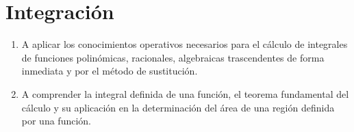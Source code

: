 \newpage
\justify
\chapter{Integraci\'on}


\begin{center}
\begin{tcolorbox}[enhanced,colback=blue!5!white, colframe=blue!5!white, title=?`Qu\'e vas a aprender?,coltitle=black, attach boxed title to top center=
{yshift=-\tcboxedtitleheight/2},
boxed title style={size=small,colback=blue!50!white}]
\begin{enumerate}
\item A aplicar los conocimientos operativos necesarios para el c\'alculo de integrales de funciones polin\'omicas, racionales, algebraicas trascendentes de forma inmediata y por el m\'etodo de sustituci\'on.\\
\item A comprender la integral definida de una funci\'on, el teorema  fundamental  del c\'alculo y su aplicaci\'on en la determinaci\'on del \'area de una regi\'on definida por una funci\'on. 
\end{enumerate}
\end{tcolorbox}
\end{center}


